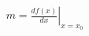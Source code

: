 \documentclass[preview]{standalone}
\begin{document}
\begin{align*}
m =\left.\frac{df(x)}{dx}\right|_{x=x_{0}}
\end{align*}
\end{document}

